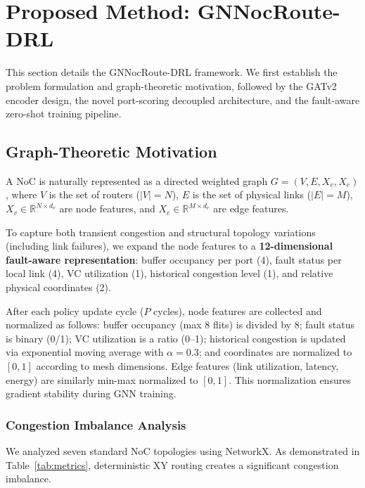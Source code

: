 \section{Proposed Method: GNNocRoute-DRL}
\label{sec:method}

This section details the GNNocRoute-DRL framework. We first establish the problem formulation and graph-theoretic motivation, followed by the GATv2 encoder design, the novel port-scoring decoupled architecture, and the fault-aware zero-shot training pipeline.

\subsection{Graph-Theoretic Motivation}
\label{sec:problem}

A NoC is naturally represented as a directed weighted graph $G = (V, E, X_v, X_e)$, where $V$ is the set of routers ($|V| = N$), $E$ is the set of physical links ($|E| = M$), $X_v \in \mathbb{R}^{N \times d_v}$ are node features, and $X_e \in \mathbb{R}^{M \times d_e}$ are edge features.

To capture both transient congestion and structural topology variations (including link failures), we expand the node features to a \textbf{12-dimensional fault-aware representation}: buffer occupancy per port (4), fault status per local link (4), VC utilization (1), historical congestion level (1), and relative physical coordinates (2).

After each policy update cycle ($P$ cycles), node features are collected and normalized as follows: buffer occupancy (max 8 flits) is divided by 8; fault status is binary (0/1); VC utilization is a ratio (0--1); historical congestion is updated via exponential moving average with $\alpha=0.3$; and coordinates are normalized to $[0,1]$ according to mesh dimensions. Edge features (link utilization, latency, energy) are similarly min-max normalized to $[0,1]$. This normalization ensures gradient stability during GNN training.

\subsubsection{Congestion Imbalance Analysis}

We analyzed seven standard NoC topologies using NetworkX. As demonstrated in Table~\ref{tab:metrics}, deterministic XY routing creates a significant congestion imbalance.

